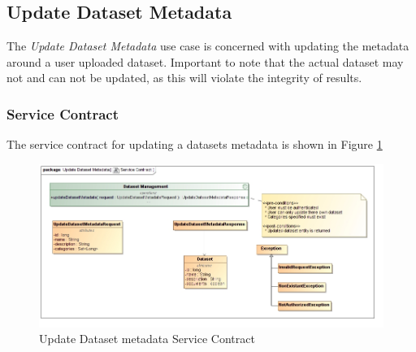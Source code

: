 \subsection {Update Dataset Metadata}
The \textit{Update Dataset Metadata} use case is concerned with updating the
metadata around a user uploaded dataset. Important to note that the actual
dataset may not and can not be updated, as this will violate the integrity of
results.
\subsubsection{Service Contract}
The service contract for updating a datasets metadata is shown in Figure \ref{fig:updateDatasetMetadataServiceContract}
\begin{figure}[H]
	\begin{center}
		\includegraphics[scale=0.38]{../Diagrams and Charts/Repository Management/Update Dataset Metadata Service Contract.jpg}
		\caption{Update Dataset metadata Service Contract}
		\label{fig:updateDatasetMetadataServiceContract}
	\end{center}	
\end{figure}

